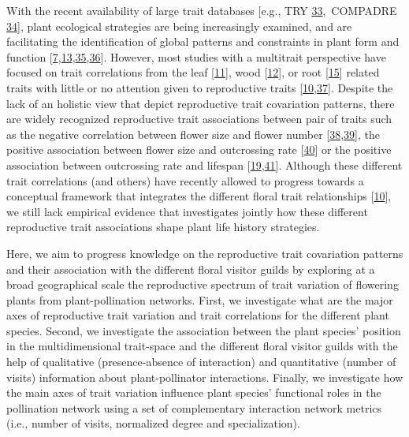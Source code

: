 \documentclass[
  12pt,
  a4paper,
]{article}
\begin{document}
With the recent availability of large trait databases {[}e.g., TRY \protect\hyperlink{ref-kattge2011}{33},~COMPADRE \protect\hyperlink{ref-salguero2015}{34}{]}, plant ecological strategies are being increasingly examined, and are facilitating the identification of global patterns and constraints in plant form and function {[}\protect\hyperlink{ref-salguero2016}{7},\protect\hyperlink{ref-diaz2016}{13},\protect\hyperlink{ref-bruelheide2018}{35},\protect\hyperlink{ref-carmona2021}{36}{]}. However, most studies with a multitrait perspective have focused on trait correlations from the leaf {[}\protect\hyperlink{ref-wright2004}{11}{]}, wood {[}\protect\hyperlink{ref-chave2009}{12}{]}, or root {[}\protect\hyperlink{ref-laughlin2021}{15}{]} related traits with little or no attention given to reproductive traits {[}\protect\hyperlink{ref-roddy2021}{10},\protect\hyperlink{ref-evojtko2020}{37}{]}. Despite the lack of an holistic view that depict reproductive trait covariation patterns, there are widely recognized reproductive trait associations between pair of traits such as the negative correlation between flower size and flower number {[}\protect\hyperlink{ref-sargent2007}{38},\protect\hyperlink{ref-kettle2011}{39}{]}, the positive association between flower size and outcrossing rate {[}\protect\hyperlink{ref-goodwillie2010}{40}{]} or the positive association between outcrossing rate and lifespan {[}\protect\hyperlink{ref-moeller2017}{19},\protect\hyperlink{ref-barrett2003}{41}{]}. Although these different trait correlations (and others) have recently allowed to progress towards a conceptual framework that integrates the different floral trait relationships {[}\protect\hyperlink{ref-roddy2021}{10}{]}, we still lack empirical evidence that investigates jointly how these different reproductive trait associations shape plant life history strategies.

Here, we aim to progress knowledge on the reproductive trait covariation patterns and their association with the different floral visitor guilds by exploring at a broad geographical scale the reproductive spectrum of trait variation of flowering plants from plant-pollination networks. First, we investigate what are the major axes of reproductive trait variation and trait correlations for the different plant species. Second, we investigate the association between the plant species' position in the multidimensional trait-space and the different floral visitor guilds with the help of qualitative (presence-absence of interaction) and quantitative (number of visits) information about plant-pollinator interactions. Finally, we investigate how the main axes of trait variation influence plant species' functional roles in the pollination network using a set of complementary interaction network metrics (i.e., number of visits, normalized degree and specialization).
\end{document}
